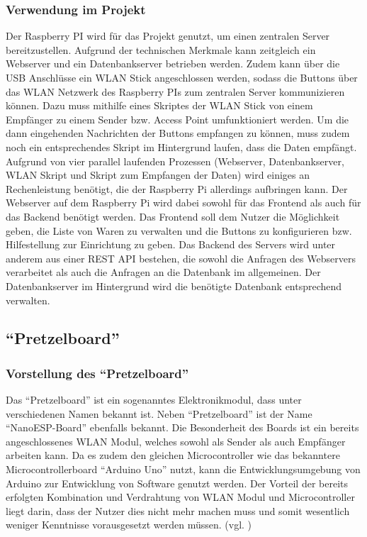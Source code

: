 \documentclass[ngerman]{scrartcl} %
\begin{document}
\subsubsection{Verwendung im Projekt}        
\label{sec:Verwendung des Raspberry PI-1} 
Der Raspberry PI wird für das Projekt genutzt, um einen zentralen Server bereitzustellen. Aufgrund der technischen Merkmale kann zeitgleich ein Webserver und ein Datenbankserver betrieben werden. Zudem kann über die USB Anschlüsse ein WLAN Stick angeschlossen werden, sodass die Buttons über das WLAN Netzwerk des Raspberry PIs zum zentralen Server kommunizieren können. Dazu muss mithilfe eines Skriptes der WLAN Stick von einem Empfänger zu einem Sender bzw. Access Point umfunktioniert werden. Um die dann eingehenden Nachrichten der Buttons empfangen zu können, muss zudem noch ein entsprechendes Skript im Hintergrund laufen, dass die Daten empfängt. Aufgrund von vier parallel laufenden Prozessen (Webserver, Datenbankserver, WLAN Skript und Skript zum Empfangen der Daten) wird einiges an Rechenleistung benötigt, die der Raspberry Pi allerdings aufbringen kann. 
Der Webserver auf dem Raspberry Pi wird dabei sowohl für das Frontend als auch für das Backend benötigt werden. Das Frontend soll dem Nutzer die Möglichkeit geben, die Liste von Waren zu verwalten und die Buttons zu konfigurieren bzw. Hilfestellung zur Einrichtung zu geben. Das Backend des Servers wird unter anderem aus einer REST API bestehen, die sowohl die Anfragen des Webservers verarbeitet als auch die Anfragen an die Datenbank im allgemeinen. 
Der Datenbankserver im Hintergrund wird die benötigte Datenbank entsprechend verwalten. 

\subsection{``Pretzelboard''}        
\label{sec:''Pretzelboard''-1} 

\subsubsection{Vorstellung des ``Pretzelboard''}        
\label{sec:Vorstellung des ``Pretzelboard''} 
Das ``Pretzelboard'' ist ein sogenanntes Elektronikmodul, dass unter verschiedenen Namen bekannt ist. Neben ``Pretzelboard'' ist der Name ``NanoESP-Board'' ebenfalls bekannt. Die Besonderheit des Boards ist ein bereits angeschlossenes WLAN Modul, welches sowohl als Sender als auch Empfänger arbeiten kann. Da es zudem den gleichen Microcontroller wie das bekanntere Microcontrollerboard ``Arduino Uno'' nutzt, kann die Entwicklungsumgebung von Arduino zur Entwicklung von Software genutzt werden. 
Der Vorteil der bereits erfolgten Kombination und Verdrahtung von WLAN Modul und Microcontroller liegt darin, dass der Nutzer dies nicht mehr machen muss und somit wesentlich weniger Kenntnisse vorausgesetzt werden müssen. (vgl. \cite{.b}\cite{.kafka}\cite{FranzisVerlagGmbH.27.11.2015})
\end{document}
